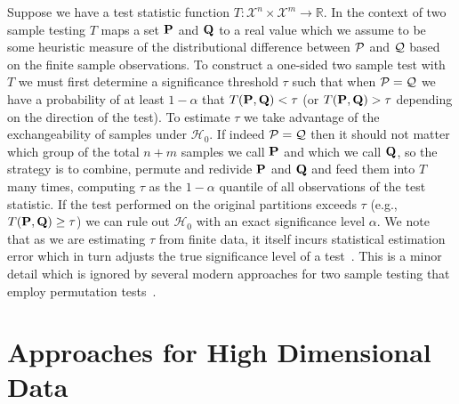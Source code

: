 Suppose we have a test statistic function $T: \mathcal{X}^n\times \mathcal{X}^m\to \mathbb{R}$.
In the context of two sample testing $T$ maps a set $\mathbf{P}$ and $\mathbf{Q}$ to a real value which we assume to be some heuristic measure
of the distributional difference between $\mathcal{P}$ and $\mathcal{Q}$ based on the finite sample observations.
To construct a one-sided two sample test with $T$ we must first determine a significance threshold $\tau$ such that when $\mathcal{P}=\mathcal{Q}$ we have a probability of at least $1-\alpha$
that $T(\mathbf{P}, \mathbf{Q}) < \tau$ (or $T(\mathbf{P}, \mathbf{Q}) > \tau$ depending on the direction of the test).
To estimate $\tau$ we take advantage of the exchangeability of samples under $\mathcal{H}_0$.
If indeed $\mathcal{P}=\mathcal{Q}$ then it should not matter which group of the total $n+m$ samples we call $\mathbf{P}$ and which we call $\mathbf{Q}$, so the strategy is to
combine, permute and redivide $\mathbf{P}$ and $\mathbf{Q}$ and feed them into $T$ many times, computing $\tau$ as the $1-\alpha$ quantile of all observations of the test statistic.
If the test performed on the original partitions exceeds $\tau$ (e.g., $T(\mathbf{P}, \mathbf{Q}) \geq \tau$) we can rule out $\mathcal{H}_0$ with an exact significance level $\alpha$.
We note that as we are estimating $\tau$ from finite data, it itself incurs statistical estimation error which in turn adjusts the true significance level of a test~\citep{NEURIPS2019_8fb21ee7}.
This is a minor detail which is ignored by several modern approaches for two sample testing that employ permutation tests~\citep{liu2020learning, zhao2022comparing}.


\section{Approaches for High Dimensional Data}\label{sec:cov-high-dimensions}
